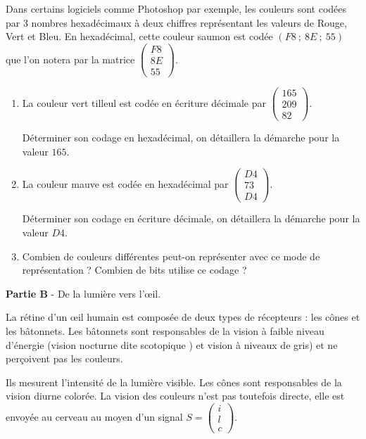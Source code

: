 \documentclass[10pt]{article}
\newcommand{\D}{\mathbb{D}}
\begin{document}
Dans certains logiciels comme Photoshop par
exemple, les couleurs sont codées par 3 nombres hexadécimaux à deux chiffres représentant les valeurs de Rouge, Vert et Bleu. En hexadécimal, cette couleur \og saumon \fg{}
est codée $(F8~;~8E~;~55)$ que l'on notera par la matrice $\begin{pmatrix}F8\\8E\\55\end{pmatrix}$.

\medskip

\begin{enumerate}
\item La couleur \og vert tilleul \fg{} est codée en écriture décimale par $\begin{pmatrix}165\\209\\82\end{pmatrix}$.

Déterminer son codage en hexadécimal, on détaillera la démarche pour la valeur $165$.
\item La couleur \og mauve \fg{} est codée en hexadécimal par $\begin{pmatrix}D4\\73\\D4\end{pmatrix}$.

Déterminer son codage en écriture décimale, on détaillera la démarche pour la valeur
$D4$.
\item Combien de couleurs différentes peut-on représenter avec ce mode de
représentation ? Combien de bits utilise ce codage ?
\end{enumerate}

\bigskip

\textbf{Partie B} - De la lumière vers l'œil.

La rétine d'un œil humain est composée de deux types de récepteurs : les cônes et les bâtonnets. Les bâtonnets sont responsables de la vision à faible niveau d'énergie (vision nocturne dite \og scotopique \fg) et vision à niveaux de gris) et ne perçoivent pas les couleurs. 

Ils mesurent l'intensité de la lumière visible. Les cônes sont responsables de la vision diurne colorée. La vision des couleurs n'est pas toutefois directe, elle est envoyée au
cerveau au moyen d'un signal $S = \begin{pmatrix}i\\l\\c\end{pmatrix}$.
\end{document}
